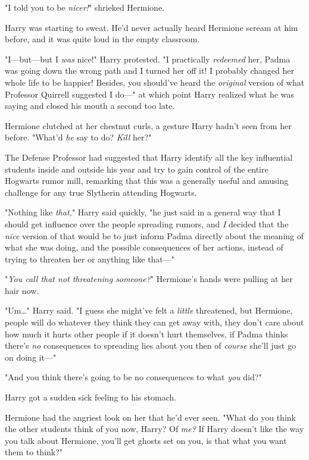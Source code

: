 "I told you to be \emph{nicer!}" shrieked Hermione.

Harry was starting to sweat. He'd never actually heard Hermione scream at him
before, and it was quite loud in the empty classroom.

"I---but---but I \emph{was} nice!" Harry protested. "I practically
\emph{redeemed} her, Padma was going down the wrong path and I turned her off
it! I probably changed her whole life to be happier! Besides, you should've
heard the \emph{original} version of what Professor Quirrell suggested I do---"
at which point Harry realized what he was saying and closed his mouth a second
too late.

Hermione clutched at her chestnut curls, a gesture Harry hadn't seen from her
before. "What'd \emph{he} say to do? \emph{Kill} her?"

The Defense Professor had suggested that Harry identify all the key influential
students inside and outside his year and try to gain control of the entire
Hogwarts rumor mill, remarking that this was a generally useful and amusing
challenge for any true Slytherin attending Hogwarts.

"Nothing like \emph{that,}" Harry said quickly, "he just said in a general way
that I should get influence over the people spreading rumors, and \emph{I}
decided that the \emph{nice} version of that would be to just inform Padma
directly about the meaning of what she was doing, and the possible consequences
of her actions, instead of trying to threaten her or anything like that---"

"\emph{You call that not threatening someone?}" Hermione's hands were pulling
at her hair now.

"Um{\ldots}" Harry said. "I guess she might've felt a \emph{little} threatened,
but Hermione, people will do whatever they think they can get away with, they
don't care about how much it hurts other people if it doesn't hurt themselves,
if Padma thinks there's \emph{no} consequences to spreading lies about you then
of \emph{course} she'll just go on doing it---"

"And you think there's going to be no consequences to what \emph{you} did?"

Harry got a sudden sick feeling to his stomach.

Hermione had the angriest look on her that he'd ever seen. "What do you think
the other students think of you now, Harry? Of \emph{me?} If Harry doesn't like
the way you talk about Hermione, you'll get ghosts set on you, is that what you
want them to think?"

